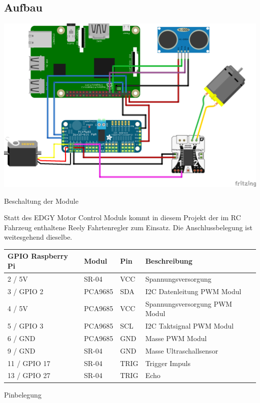   \subsection{Aufbau}
    \begin{minipage}{\columnwidth}
      \makeatletter
      \def\@captype{figure}
      \makeatother
      \centering
      \includegraphics[width=1\linewidth]{images/hw_schematics.png}
      \caption{Beschaltung der Module}
      \label{fig:img-hw-06}
    \end{minipage}
    \vspace{1cm}

    \noindent
    Statt des EDGY Motor Control Moduls kommt in diesem Projekt der im RC
    Fahrzeug enthaltene Reely Fahrtenregler zum Einsatz. Die Anschlussbelegung
    ist weitesgehend dieselbe. \\

    \begin{minipage}{\columnwidth}
      \makeatletter
      \def\@captype{table}
      \makeatother
      \centering
      \begin{tabular}{l | l | l | l}
      GPIO Raspberry Pi & Modul & Pin & Beschreibung \\ \hline \hline
      2 / 5V & SR-04 & VCC & Spannungsversorgung \\
      3 / GPIO 2 & PCA9685 & SDA & I2C Datenleitung PWM Modul \\
      4 / 5V & PCA9685 & VCC & Spannungsversorgung PWM Modul \\
      5 / GPIO 3 & PCA9685 & SCL & I2C Taktsignal PWM Modul \\
      6 / GND & PCA9685 & GND & Masse PWM Modul \\
      9 / GND & SR-04 & GND & Masse Ultraschallsensor \\
      11 / GPIO 17 & SR-04 & TRIG & Trigger Impuls \\
      13 / GPIO 27 & SR-04 & TRIG & Echo \\
      
      \end{tabular}
      \caption{Pinbelegung}
      \label{tab:hw-01}
    \end{minipage}

